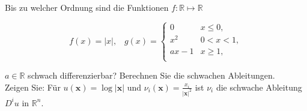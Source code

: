 \begin{exercise}

Bis zu welcher Ordnung sind die Funktionen $f: \mathbb{R} \mapsto \mathbb{R}$

\begin{equation*}
    f(x) = |x|, \hspace{10pt} g(x) =
    \begin{cases}
    0 & x \leq 0, \\
    x^2 & 0 < x < 1, \\
    ax - 1 & x \geq 1, \\
    \end{cases}
\end{equation*}

$a \in \mathbb{R}$ schwach differenzierbar? Berechnen Sie die schwachen Ableitungen. \\

Zeigen Sie: Für $u(\textbf{x}) = \log|\textbf{x}|$ und $\nu_i(\textbf{x}) = \frac{x_i}{|\textbf{x}|^2}$ ist $\nu_i$ die schwache Ableitung $D^iu$ in $\mathbb{R}^n$.

\end{exercise}

